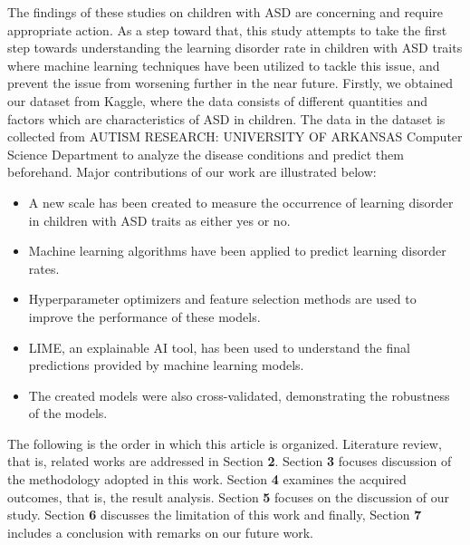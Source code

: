 \documentclass{article}
\begin{document}
\begin{multicols}{2}
\hspace*{\parindent} The findings of these studies on children with ASD are concerning and require appropriate action. As a step toward that, this study attempts to take the first step towards understanding the learning disorder rate in children with ASD traits where machine learning techniques have been utilized to tackle this issue, and prevent the issue from worsening further in the near future. Firstly, we obtained our dataset from Kaggle, where the data consists of different quantities and factors which are characteristics of ASD in children. The data in the dataset is collected from AUTISM RESEARCH: UNIVERSITY OF ARKANSAS Computer Science Department to analyze the disease conditions and predict them beforehand. Major contributions of our work are illustrated below: 
\begin{itemize}
    \item A new scale has been created to measure the occurrence of learning disorder in children with ASD traits as either yes or no.
    \item Machine learning algorithms have been applied to predict learning disorder rates. 
    \item Hyperparameter optimizers and feature selection methods are used to improve the performance of these models. 
    \item LIME, an explainable AI tool, has been used to understand the final predictions provided by machine learning models. 
    \item The created models were also cross-validated, demonstrating the robustness of the models.
\end{itemize}
\hspace*{\parindent} The following is the order in which this article is organized. Literature review, that is, related works are addressed in Section \textbf{2}. Section \textbf{3} focuses discussion of the methodology adopted in this work. Section \textbf{4} examines the acquired outcomes, that is, the result analysis. Section \textbf{5} focuses on the discussion of our study. Section \textbf{6} discusses the limitation of this work and finally, Section \textbf{7} includes a conclusion with remarks on our future work.


\end{multicols}
\end{document}
